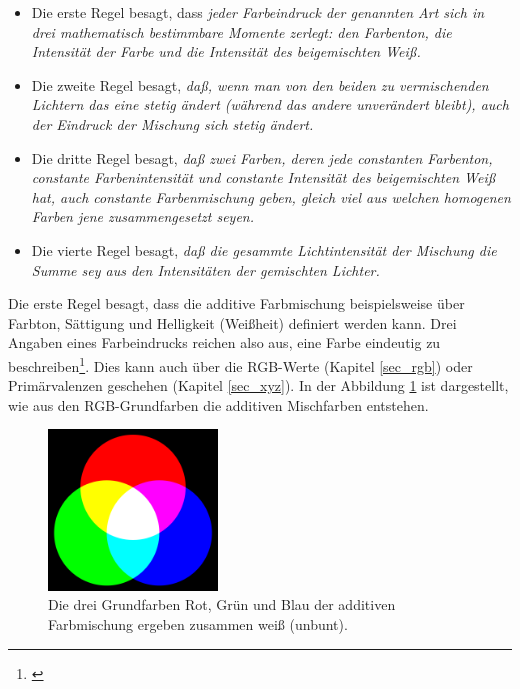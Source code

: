 \begin{itemize}
\item Die erste Regel besagt, dass \emph{\glqq jeder Farbeindruck der genannten Art sich in drei mathematisch bestimmbare Momente zerlegt: den Farbenton, die Intensität der Farbe und die Intensität des beigemischten Weiß.\grqq} \citep[70]{grassmann}
\item Die zweite Regel besagt, \emph{\glqq daß, wenn man von den beiden zu vermischenden Lichtern das eine stetig ändert (während das andere unverändert bleibt), auch der Eindruck der Mischung sich stetig ändert.\grqq} \citep[72]{grassmann}
\item Die dritte Regel besagt, \emph{\glqq daß zwei Farben, deren jede constanten Farbenton, constante Farbenintensität und constante Intensität des beigemischten Weiß hat, auch constante Farbenmischung geben, gleich viel aus welchen homogenen Farben jene zusammengesetzt seyen.\grqq} \citep[78]{grassmann}
\item Die vierte Regel besagt, \emph{\glqq daß die gesammte Lichtintensität der Mischung die Summe sey aus den Intensitäten der gemischten Lichter.\grqq} \citep[82]{grassmann}

\end{itemize}

\noindent Die erste Regel besagt, dass die additive Farbmischung beispielsweise über Farbton, Sättigung und Helligkeit (Weißheit) definiert werden kann. Drei Angaben eines Farbeindrucks reichen also aus, eine Farbe eindeutig zu beschreiben\footnote{\cite[105]{hentschel}}. Dies kann auch über die RGB-Werte (Kapitel \ref{sec_rgb}) oder Primärvalenzen geschehen (Kapitel \ref{sec_xyz}). In der Abbildung \ref{b_farben+} ist dargestellt, wie aus den RGB-Grundfarben die additiven Mischfarben entstehen.

\begin{figure}[H]     %
\centering
\includegraphics[width=0.4\textwidth]{bilder/farben+} 
\caption {Die drei Grundfarben Rot, Grün und Blau der additiven Farbmischung ergeben zusammen weiß (unbunt)\protect\footnotemark .}\label{b_farben+}
\end{figure}

